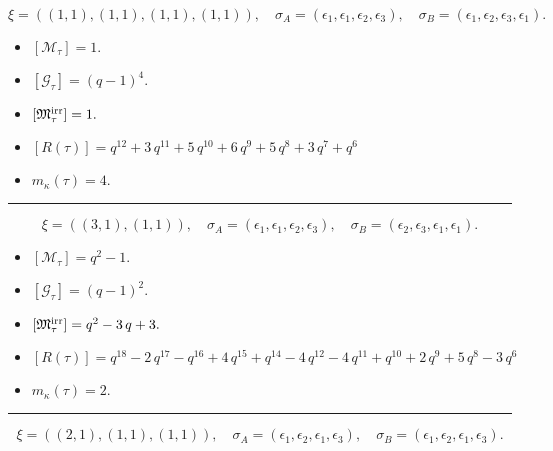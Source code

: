 \documentclass[10pt,a4paper]{amsart}
\begin{document}
$$\xi = ({(1, 1), (1, 1), (1, 1), (1, 1)}),\quad \sigma_A = ({{\epsilon_1}, {\epsilon_1}, {\epsilon_2}, {\epsilon_3}}),\quad \sigma_B = ({{\epsilon_1}, {\epsilon_2}, {\epsilon_3}, {\epsilon_1}}).$$

\begin{itemize}
 \item $[\mathcal{M}_{\tau}] = 1 .$

 \item $[\mathcal{G}_{\tau}] = {\left(q - 1\right)}^{4} .$

 \item $[{\frak M}_{\tau}^{\textrm{irr}}] = 1 .$

 \item $[R(\tau)] = q^{12} + 3 \, q^{11} + 5 \, q^{10} + 6 \, q^{9} + 5 \, q^{8} + 3 \, q^{7} + q^{6} $

 \item $m_{\kappa}(\tau) = 4 .$

 \end{itemize}
\noindent\rule{8cm}{0.4pt}

$$\xi = ({(3, 1)}, {(1, 1)}),\quad \sigma_A = ({{\epsilon_1, \epsilon_1, \epsilon_2}}, {{\epsilon_3}}),\quad \sigma_B = ({{\epsilon_2, \epsilon_3, \epsilon_1}}, {{\epsilon_1}}).$$

\begin{itemize}
 \item $[\mathcal{M}_{\tau}] = q^{2} - 1 .$

 \item $[\mathcal{G}_{\tau}] = {\left(q - 1\right)}^{2} .$

 \item $[{\frak M}_{\tau}^{\textrm{irr}}] = q^{2} - 3 \, q + 3 .$

 \item $[R(\tau)] = q^{18} - 2 \, q^{17} - q^{16} + 4 \, q^{15} + q^{14} - 4 \, q^{12} - 4 \, q^{11} + q^{10} + 2 \, q^{9} + 5 \, q^{8} - 3 \, q^{6} $

 \item $m_{\kappa}(\tau) = 2 .$

 \end{itemize}
\noindent\rule{8cm}{0.4pt}

$$\xi = ({(2, 1), (1, 1)}, {(1, 1)}),\quad \sigma_A = ({{\epsilon_1, \epsilon_2}, {\epsilon_1}}, {{\epsilon_3}}),\quad \sigma_B = ({{\epsilon_1, \epsilon_2}, {\epsilon_1}}, {{\epsilon_3}}).$$
\end{document}
